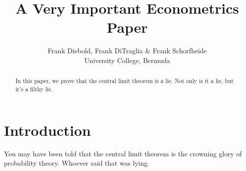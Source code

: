 \documentclass[12pt,letterpaper]{article}
\title{A Very Important Econometrics Paper}
\author{Frank Diebold, Frank DiTraglia & Frank Schorfheide \\ University College, Bermuda}
\begin{document}
\maketitle

\begin{abstract}
	In this paper, we prove that the central limit theorem is a lie. 
	Not only is it a lie, but it's a filthy lie.
\end{abstract}

\section{Introduction}
You may have been told that the central limit theorem is the crowning glory of probability theory.
Whoever said that was lying.
\end{document}
